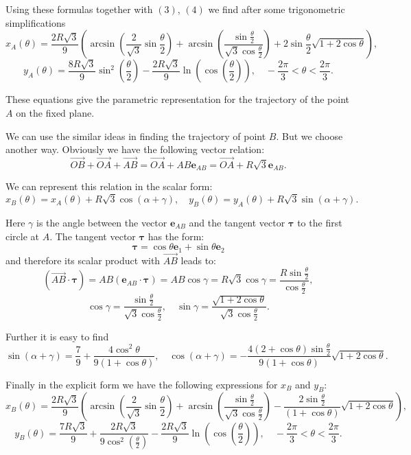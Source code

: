 \documentclass[10pt]{enoc2011}
\renewcommand{\vec}[1]{\boldsymbol{#1}}
\begin{document}
Using these formulas together with $(3)$, $(4)$ we find after some trigonometric simplifications
$$
x_A\left(\theta\right)\!=\!\frac{2R\sqrt{3}}{9}\left(\arcsin\left(\frac{2}{\sqrt{3}}\sin\frac{\theta}{2}\right)\!+\!
\arcsin\left(\frac{\sin\frac{\theta}{2}}{\sqrt{3}\cos\frac{\theta}{2}}\right)\!+\!
2\sin\frac{\theta}{2}\sqrt{1\!+\!2\cos\theta}\right),
$$
$$
y_A\left(\theta\right)=\frac{8R\sqrt{3}}{9}\sin^2\left(\frac{\theta}{2}\right)-\frac{2R\sqrt{3}}{9}\ln\left(\cos\left(\frac{\theta}{2}\right)\right),
\quad -\frac{2\pi}{3}<\theta<\frac{2\pi}{3}.
$$

These equations give the parametric representation for the trajectory of the point $A$ on the fixed plane.

We can use the similar ideas in finding  the trajectory of point $B$. But we choose another way. Obviously we have the following vector relation:
$$
\overrightarrow{OB}+\overrightarrow{OA}+\overrightarrow{AB}=\overrightarrow{OA}+AB\vec e_{AB}
=\overrightarrow{OA}+R\sqrt{3}\vec e_{AB}.
$$

We can represent this relation in the scalar form:
$$
x_B\left(\theta\right)=x_A\left(\theta\right)+R\sqrt{3}\cos\left(\alpha+\gamma\right),\quad
y_B\left(\theta\right)=y_A\left(\theta\right)+R\sqrt{3}\sin\left(\alpha+\gamma\right).
$$

Here $\gamma$ is the angle between the vector $\vec e_{AB}$ and the tangent vector $\vec\tau$ to the first circle at $A$. The tangent vector $\vec\tau$ has the form:
$$
\vec\tau=\cos\theta\vec e_1+\sin\theta\vec e_2
$$
and therefore its scalar product with $\overrightarrow{AB}$ leads to:
$$
\left(\overrightarrow{AB}\cdot\vec\tau\right)=AB\left(\vec e_{AB}\cdot\vec\tau\right)=AB\cos\gamma=
R\sqrt{3}\cos\gamma=\frac{R\sin\frac{\theta}{2}}{\cos\frac{\theta}{2}},
$$
$$
\cos\gamma=\frac{\sin\frac{\theta}{2}}{\sqrt{3}\cos\frac{\theta}{2}},\quad
\sin\gamma=\frac{\sqrt{1+2\cos\theta}}{\sqrt{3}\cos\frac{\theta}{2}}.
$$

Further it is easy to find
$$
\sin\left(\alpha+\gamma\right)=\frac{7}{9}+\frac{4\cos^2\theta}{9\left(1+\cos\theta\right)},\quad
\cos\left(\alpha+\gamma\right)=-\frac{4\left(2+\cos\theta\right)\sin\frac{\theta}{2}}{9\left(1+\cos\theta\right)}
\sqrt{1+2\cos\theta}.
$$

Finally in the explicit form we have the following expressions for $x_B$ and $y_B$:
$$
x_B\left(\theta\right)\!=\!\frac{2R\sqrt{3}}{9}\left(\arcsin\left(\frac{2}{\sqrt{3}}\sin\frac{\theta}{2}\right)\!+\!
\arcsin\left(\frac{\sin\frac{\theta}{2}}{\sqrt{3}\cos\frac{\theta}{2}}\right)\!-\!
\frac{2\sin\frac{\theta}{2}}{\left(1\!+\!\cos\theta\right)}\sqrt{1\!+\!2\cos\theta}\right),
$$
$$
y_B\left(\theta\right)=\frac{7R\sqrt{3}}{9}+\frac{2R\sqrt{3}}{9\cos^2\left(\frac{\theta}{2}\right)}-\frac{2R\sqrt{3}}{9}\ln\left(\cos\left(\frac{\theta}{2}\right)\right),
\quad -\frac{2\pi}{3}<\theta<\frac{2\pi}{3}.
$$
\end{document}
